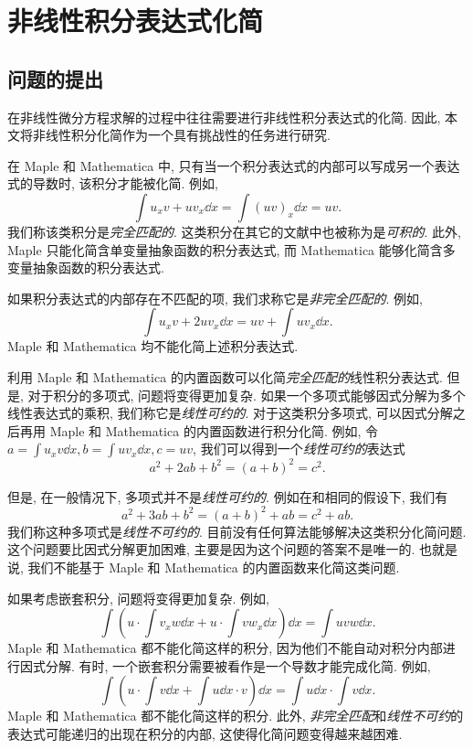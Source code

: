 \chapter{非线性积分表达式化简}\label{ch06}
\section{问题的提出}
在非线性微分方程求解的过程中往往需要进行非线性积分表达式的化简. 因此, 本文将非线性积分化简作为一个具有挑战性的任务进行研究.

在 Maple 和 Mathematica 中, 只有当一个积分表达式的内部可以写成另一个表达式的导数时, 该积分才能被化简. 例如, 
\begin{equation}
\int\!{u_xv+uv_x \dd x}=\int\!{(uv)_x\dd x}=uv.
\label{complete_matched}
\end{equation}
我们称该类积分是\emph{完全匹配的}. 这类积分在其它的文献中也被称为是\emph{可积的}. 此外, Maple 只能化简含单变量抽象函数的积分表达式, 而 Mathematica 能够化简含多变量抽象函数的积分表达式. 

如果积分表达式的内部存在不匹配的项, 我们求称它是\emph{非完全匹配的}. 例如,
\begin{equation}
\int\!{u_xv+2uv_x \dd x}=uv+\int\!{uv_x\dd x}.
\label{incomplete_matched}
\end{equation}
Maple 和 Mathematica 均不能化简上述积分表达式. 

利用 Maple 和 Mathematica 的内置函数可以化简\emph{完全匹配的}线性积分表达式. 但是, 对于积分的多项式, 问题将变得更加复杂. 如果一个多项式能够因式分解为多个线性表达式的乘积, 我们称它是\emph{线性可约的}. 对于这类积分多项式, 可以因式分解之后再用 Maple 和 Mathematica 的内置函数进行积分化简. 例如, 令$a=\int{u_x v \dd x},b=\int{u v_x \dd x},c=uv$, 我们可以得到一个\emph{线性可约的}表达式
\begin{equation}
a^2+2ab+b^2=(a+b)^2=c^2.
\label{liner_reducible}
\end{equation}

但是, 在一般情况下, 多项式并不是\emph{线性可约的}. 例如在和相同的假设下, 我们有
\begin{equation}
a^2+3ab+b^2=(a+b)^2+ab=c^2+ab.
\label{non_linear_reducible}
\end{equation} 
我们称这种多项式是\emph{线性不可约的}. 目前没有任何算法能够解决这类积分化简问题. 这个问题要比因式分解更加困难, 主要是因为这个问题的答案不是唯一的. 也就是说, 我们不能基于 Maple 和 Mathematica 的内置函数来化简这类问题. 

如果考虑嵌套积分, 问题将变得更加复杂. 例如, 
\begin{equation}
\int\!{\left(u\cdot\int\!{v_xw\dd x}+u\cdot\int\!{vw_x\dd x}\right)\dd x}=\int\!{uvw\dd x}.
\label{nested_integral}
\end{equation}
Maple 和 Mathematica 都不能化简这样的积分, 因为他们不能自动对积分内部进行因式分解. 有时, 一个嵌套积分需要被看作是一个导数才能完成化简. 例如,
\begin{equation}
\int\!{\left(u\cdot\int\!{v\dd x}+\int\!{u\dd x}\cdot v\right)\dd x}=\int\!{u\dd x}\cdot\int\!{v\dd x}.
\label{integral_as_differential}
\end{equation}
Maple 和 Mathematica 都不能化简这样的积分. 此外, \emph{非完全匹配}和\emph{线性不可约}的表达式可能递归的出现在积分的内部, 这使得化简问题变得越来越困难.

